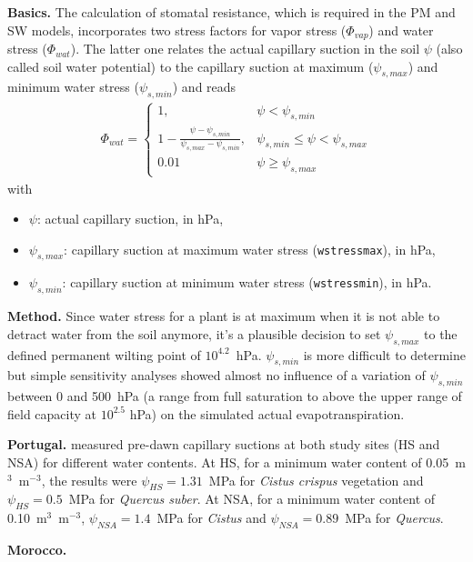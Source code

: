 \documentclass{scrreprt}
\newenvironment{denseitem}{
  \begin{itemize}
    \setlength{\itemsep}{0pt}
    \setlength{\parskip}{0pt}
    \setlength{\parsep}{0pt}
}{
  \end{itemize}
}
\begin{document}
\textbf{Basics.}
The calculation of stomatal resistance, which is required in the PM and SW models, incorporates two stress factors for vapor stress ($\Phi_{vap}$) and water stress ($\Phi_{wat}$).
The latter one relates the actual capillary suction in the soil $\psi$ (also called soil water potential) to the capillary suction at maximum ($\psi_{s,max}$) and minimum water stress ($\psi_{s,min}$) and reads
%
\begin{align*}
  \Phi_{wat} = \begin{cases}
                1, & \psi < \psi_{s,min} \\
                1 - \frac{\psi - \psi_{s,min}}{\psi_{s,max} - \psi_{s,min}}, & \psi_{s,min} \leq \psi < \psi_{s,max} \\
                0.01 & \psi \geq \psi_{s,max}
              \end{cases}
\end{align*}
%
with
\begin{denseitem}
  \item[] $\psi$: actual capillary suction, in hPa,
  \item[] $\psi_{s,max}$: capillary suction at maximum water stress (\verb!wstressmax!), in hPa,
  \item[] $\psi_{s,min}$: capillary suction at minimum water stress (\verb!wstressmin!), in hPa.
\end{denseitem}

\textbf{Method.}
Since water stress for a plant is at maximum when it is not able to detract water from the soil anymore, it's a plausible decision to set $\psi_{s,max}$ to the defined \citep{scheffer10} permanent wilting point of $10^{4.2}$~hPa.
$\psi_{s,min}$ is more difficult to determine but simple sensitivity analyses showed almost no influence of a variation of $\psi_{s,min}$ between 0 and 500~hPa (a range from full saturation to above the upper range of field capacity at $10^{2.5}$ hPa) on the simulated actual evapotranspiration.

\textbf{Portugal.}
\citet{gazdar16} measured pre-dawn capillary suctions at both study sites (HS and NSA) for different water contents.
At HS, for a minimum water content of 0.05~m$^3$~m$^{-3}$, the results were $\psi_{HS} = 1.31$~MPa for \emph{Cistus crispus} vegetation and $\psi_{HS} = 0.5$~MPa for \emph{Quercus suber}.
At NSA, for a minimum water content of 0.10~m$^3$~m$^{-3}$, $\psi_{NSA} = 1.4$~MPa for \emph{Cistus} and $\psi_{NSA} = 0.89$~MPa for \emph{Quercus}.


\textbf{Morocco.}
\end{document}
